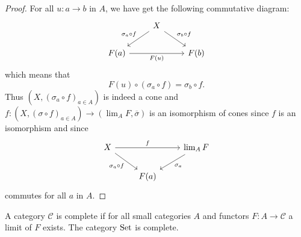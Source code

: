 \begin{proof}
    For all $u \colon a \to b$ in $A$, we have get the following commutative diagram: 
    \[
    \begin{tikzcd}
        &
        X
        \arrow[ld,"\sigma_a \circ f"']
        \arrow[rd,"\sigma_b \circ f"]
        &
        \\
        F(a)
        \arrow[rr, "F(u)"']
        &
        &
        F(b)
    \end{tikzcd}
    \]
    which means that 
    \[
    F(u) \circ (\sigma_a \circ f) =\sigma_b \circ f.
    \]
    Thus $(X,(\sigma_a \circ f)_{a \in A})$ is indeed a cone and $f \colon (X, ( \sigma \circ f )_{a \in A}) \to (\lim_A F , \overline{\sigma})$ is an isomorphism of cones since $f$ is an isomorphism and since 
    \[
    \begin{tikzcd}
        X
        \arrow[rr,"f"]
        \arrow[rd,"\sigma_a \circ f"']
        &
        &
        \lim_A F
        \arrow[ld, "\sigma_a"]
        \\
        &
        F(a)
        &
    \end{tikzcd}
    \]
    commutes for all $a$ in $A$.
\end{proof}

\begin{defi/prop}
    A category $\mathcal{C}$ is complete if for all small categories $A$ and functors $F:A \to \mathcal{C}$ a limit of $F$ exists.
    The category $\operatorname{Set}$ is complete.
\end{defi/prop}

